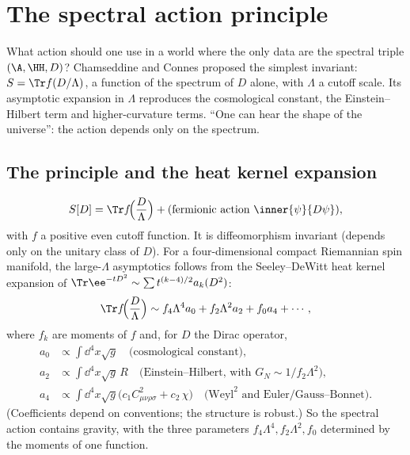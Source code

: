 \chapter{The spectral action principle}\label{ch:spectral_action}
\skippable

\begin{physmotiv}
What action should one use in a world where the only data are the spectral triple $(\A,\HH,D)$? Chamseddine and Connes proposed the simplest invariant: $S=\Tr f(D/\Lambda)$, a function of the spectrum of $D$ alone, with $\Lambda$ a cutoff scale. Its asymptotic expansion in $\Lambda$ reproduces the cosmological constant, the Einstein--Hilbert term and higher-curvature terms. ``One can hear the shape of the universe'': the action depends only on the spectrum.
\end{physmotiv}

\section{The principle and the heat kernel expansion}

\begin{equation}
S[D]=\Tr f\!\Big(\frac{D}{\Lambda}\Big)+\text{(fermionic action }\inner{\psi}{D\psi}),
\end{equation}
with $f$ a positive even cutoff function. It is diffeomorphism invariant (depends only on the unitary class of $D$). For a four-dimensional compact Riemannian spin manifold, the large-$\Lambda$ asymptotics follows from the Seeley--DeWitt heat kernel expansion of $\Tr\ee^{-tD^2}\sim\sum t^{(k-4)/2}a_k(D^2)$:
\begin{equation}
\Tr f\!\Big(\frac D\Lambda\Big)\sim f_4\Lambda^4a_0+f_2\Lambda^2a_2+f_0a_4+\cdots,
\end{equation}
where $f_k$ are moments of $f$ and, for $D$ the Dirac operator,
\begin{align}
a_0&\propto\int\dd^4x\sqrt g\quad\text{(cosmological constant)},\\
a_2&\propto\int\dd^4x\sqrt g\,R\quad\text{(Einstein--Hilbert, with $G_N\sim1/f_2\Lambda^2$)},\\
a_4&\propto\int\dd^4x\sqrt g\big(c_1C^2_{\mu\nu\rho\sigma}+c_2\,\chi\big)\quad\text{(Weyl}^2\text{ and Euler/Gauss--Bonnet)}.
\end{align}
(Coefficients depend on conventions; the structure is robust.) So the spectral action contains gravity, with the three parameters $f_4\Lambda^4,f_2\Lambda^2,f_0$ determined by the moments of one function.

